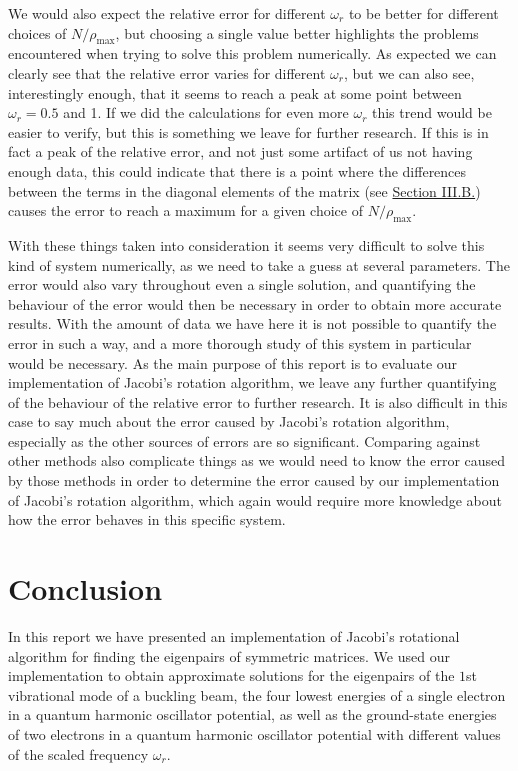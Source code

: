 \documentclass[reprint,english,notitlepage]{revtex4-1}  %
\begin{document}
We would also expect the relative error for different $\omega_r$ to be better for different choices of $N/\rho_\text{max}$, but choosing a single value better highlights the problems encountered when trying to solve this problem numerically. As expected we can clearly see that the relative error varies for different $\omega_r$, but we can also see, interestingly enough, that it seems to reach a peak at some point between $\omega_r = 0.5$ and 1. If we did the calculations for even more $\omega_r$ this trend would be easier to verify, but this is something we leave for further research. If this is in fact a peak of the relative error, and not just some artifact of us not having enough data, this could indicate that there is a point where the differences between the terms in the diagonal elements of the matrix (see \hyperref[sec:III:b]{Section III.B.}) causes the error to reach a maximum for a given choice of $N/\rho_\text{max}$. 

With these things taken into consideration it seems very difficult to solve this kind of system numerically, as we need to take a guess at several parameters. The error would also vary throughout even a single solution, and quantifying the behaviour of the error would then be necessary in order to obtain more accurate results. With the amount of data we have here it is not possible to quantify the error in such a way, and a more thorough study of this system in particular would be necessary. As the main purpose of this report is to evaluate our implementation of Jacobi's rotation algorithm, we leave any further quantifying of the behaviour of the relative error to further research. It is also difficult in this case to say much about the error caused by Jacobi's rotation algorithm, especially as the other sources of errors are so significant. Comparing against other methods also complicate things as we would need to know the error caused by those methods in order to determine the error caused by our implementation of Jacobi's rotation algorithm, which again would require more knowledge about how the error behaves in this specific system.



\section{Conclusion} \label{sec:VI}
In this report we have presented an implementation of Jacobi's rotational algorithm for finding the eigenpairs of symmetric matrices. We used our implementation to obtain approximate solutions for the eigenpairs of the \(1\)st vibrational mode of a buckling beam, the four lowest energies of a single electron in a quantum harmonic oscillator potential, as well as the ground-state energies of two electrons in a quantum harmonic oscillator potential with different values of the scaled frequency \(\omega_{r}\).
\end{document}
